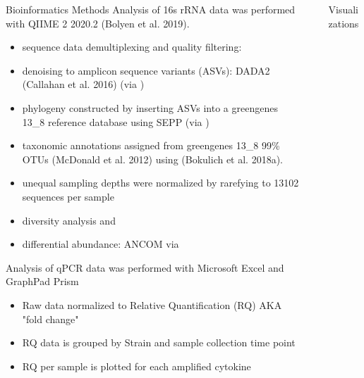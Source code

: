 \documentclass[final]{beamer}
\newlength{\sepwidth}
\newlength{\colwidth}
\newcommand{\separatorcolumn}{\begin{column}{\sepwidth}\end{column}}
\begin{document}
\begin{frame}[t]
\begin{columns}[t]
\begin{column}{\colwidth}
\begin{block}{Bioinformatics Methods}
    Analysis of 16s rRNA data was performed with QIIME 2 2020.2 (Bolyen et al. 2019).
    \begin{itemize}
      \item {sequence data demultiplexing and quality filtering: }
      \item {denoising to amplicon sequence variants (ASVs): DADA2 (Callahan et al. 2016) (via )}
      \item {phylogeny constructed by inserting ASVs into a greengenes 13\_8 reference database using SEPP (via )}
      \item {taxonomic annotations assigned from greengenes 13\_8 99\% OTUs (McDonald et al. 2012) using  (Bokulich et al. 2018a).}
      \item {unequal sampling depths were normalized by rarefying to 13102 sequences per sample}
      \item {diversity analysis   and }
      \item {differential abundance: ANCOM via }
    \end{itemize}

    Analysis of qPCR data was performed with Microsoft Excel and GraphPad Prism
    \begin{itemize}
      \item {Raw data normalized to Relative Quantification (RQ) AKA "fold change"}
      \item {RQ data is grouped by Strain and sample collection time point}
      \item {RQ per sample is plotted for each amplified cytokine}
    \end{itemize} 

  \end{block}

\end{column}

\separatorcolumn

\begin{column}{\colwidth}

  \begin{block}{Visualizations}


\end{block}
\end{column}
\end{columns}
\end{frame}
\end{document}
